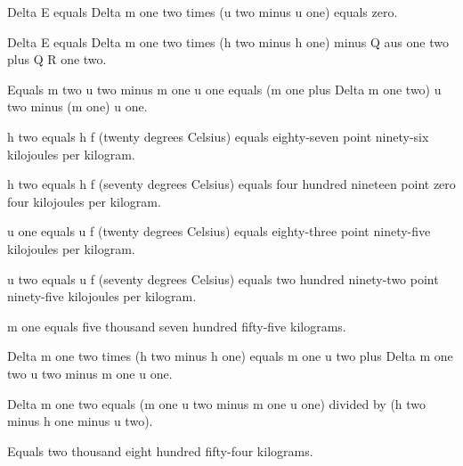 Delta E equals Delta m one two times (u two minus u one) equals zero.

Delta E equals Delta m one two times (h two minus h one) minus Q aus one two plus Q R one two.

Equals m two u two minus m one u one equals (m one plus Delta m one two) u two minus (m one) u one.

h two equals h f (twenty degrees Celsius) equals eighty-seven point ninety-six kilojoules per kilogram.

h two equals h f (seventy degrees Celsius) equals four hundred nineteen point zero four kilojoules per kilogram.

u one equals u f (twenty degrees Celsius) equals eighty-three point ninety-five kilojoules per kilogram.

u two equals u f (seventy degrees Celsius) equals two hundred ninety-two point ninety-five kilojoules per kilogram.

m one equals five thousand seven hundred fifty-five kilograms.

Delta m one two times (h two minus h one) equals m one u two plus Delta m one two u two minus m one u one.

Delta m one two equals (m one u two minus m one u one) divided by (h two minus h one minus u two).

Equals two thousand eight hundred fifty-four kilograms.